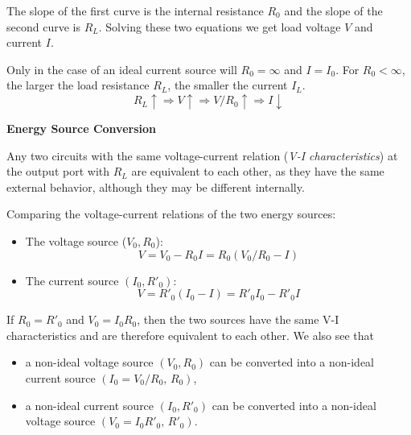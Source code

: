 \documentclass{article}
\begin{document}

The slope of the first curve is the internal resistance $R_0$ and the slope 
of the second curve is $R_L$. Solving these two equations we get load voltage
$V$ and current $I$.

Only in the case of an ideal current source will $R_0=\infty$ and $I=I_0$. 
For $R_0<\infty$, the larger the load resistance $R_L$, the smaller the 
current $I_L$.
\begin{equation}
  R_L \uparrow \Longrightarrow V \uparrow \Longrightarrow V/R_0 \uparrow
  \Longrightarrow I \downarrow 
\end{equation}

{\bf Energy Source Conversion}

Any two circuits with the same voltage-current relation 
({\em V-I characteristics}) at the output port with $R_L$ are 
equivalent to each other, as they have the same external behavior, 
although they may be different internally.


Comparing the voltage-current relations of the two energy sources:
\begin{itemize} 
\item The voltage source ($V_0, R_0$):
  \begin{equation}
    V=V_0-R_0I=R_0(V_0/R_0-I) 
\end{equation}
\item The current source $(I_0, R'_0)$:
  \begin{equation}
    V=R'_0(I_0-I)=R'_0I_0-R'_0I 
  \end{equation}
\end{itemize} 
If $R_0=R'_0$ and $V_0=I_0 R_0$, then the two sources have the same
V-I characteristics and are therefore equivalent to each other. We
also see that
\begin{itemize}
\item a non-ideal voltage source $(V_0, R_0)$ can be converted into a 
  non-ideal current source $(I_0=V_0/R_0,\,R_0)$,
\item a non-ideal current source $(I_0, R'_0)$ can be converted into a 
  non-ideal voltage source $(V_0=I_0R'_0,\,R'_0)$.
\end{itemize}

\end{document}
